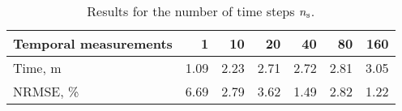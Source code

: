 \begin{table}[h]
  \centering
  \caption{Results for the number of time steps ${n_\text{s}}$.}
  \begin{tabular*}{1\linewidth}{lrrrrrr}
    \toprule
    Temporal measurements & 1 & 10 & 20 & 40 & 80 & 160 \\
    \midrule
    Time, m   & 1.09 & 2.23 & 2.71 & 2.72 & 2.81 & 3.05 \\
    NRMSE, \% & 6.69 & 2.79 & 3.62 & 1.49 & 2.82 & 1.22 \\
    \bottomrule
  \end{tabular*}
  \vspace{-1em}
\end{table}
